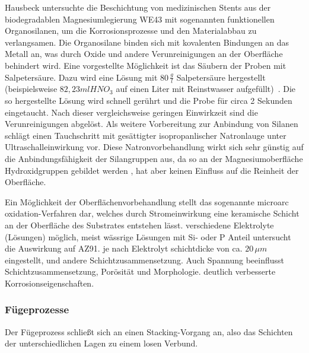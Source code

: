 Hausbeck \cite{Hausbeck.2012} untersuchte die Beschichtung von medizinischen Stents aus der biodegradablen Magnesiumlegierung WE43 mit sogenannten funktionellen Organosilanen, um die Korrosionsprozesse und den Materialabbau zu verlangsamen.
Die Organosilane binden sich mit kovalenten Bindungen an das Metall an, was durch Oxide und andere Verunreinigungen an der Oberfläche behindert wird.
Eine vorgestellte Möglichkeit ist das Säubern der Proben mit Salpetersäure.
Dazu wird eine Lösung mit $80\, \frac{g}{l}$ Salpetersäure hergestellt (beispielsweise $82,23 ml HNO_3$ auf einen Liter mit Reinstwasser aufgefüllt)~.
Die so hergestellte Lösung wird schnell gerührt und die Probe für circa 2 Sekunden eingetaucht.
Nach dieser vergleichsweise geringen Einwirkzeit sind die Verunreinigungen abgelöst.
Als weitere Vorbereitung zur Anbindung von Silanen schlägt \cite{Hausbeck.2012} einen Tauchschritt mit gesättigter isopropanlischer Natronlauge unter Ultraschalleinwirkung vor.
Diese Natronvorbehandlung wirkt sich sehr günstig auf die Anbindungsfähigkeit der Silangruppen aus, da so an der Magnesiumoberfläche Hydroxidgruppen gebildet werden \cite{Hausbeck.2012,Gou.2004}, hat aber keinen Einfluss auf die Reinheit der Oberfläche.

Ein Möglichkeit der Oberflächenvorbehandlung stellt das sogenannte microarc oxidation-Verfahren dar, welches durch Stromeinwirkung eine keramische Schicht an der Oberfläche des Substrates entstehen lässt.
verschiedene Elektrolyte (Lösungen) möglich, meist wässrige Lösungen mit Si- oder P Anteil
\cite{Cai.2006} untersucht die Auswirkung auf AZ91. je nach Elektrolyt schichtdicke von ca. $20 \, \mu m$ eingestellt, und andere Schichtzusammensetzung.
Auch Spannung beeinflusst Schichtzusammensetzung, Porösität und Morphologie.
deutlich verbesserte Korrosionseigenschaften.

\subsubsection{Fügeprozesse}

Der Fügeprozess schließt sich an einen Stacking-Vorgang an, also das Schichten der unterschiedlichen Lagen zu einem losen Verbund.

